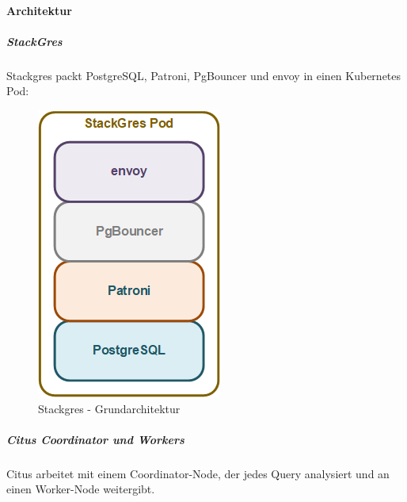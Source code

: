 \begin{flushleft}
    \paragraph{Architektur}
    \begin{flushleft}
        \subparagraph{StackGres}
        Stackgres packt PostgreSQL, Patroni, PgBouncer und envoy in einen Kubernetes Pod:
        \begin{figure}[H]
            \centering
            \includegraphics[width=0.65\linewidth]{source/implementation/evaluation/postgresql_ha_solutions/stackgres/stackgres_pod_architecture}
            \caption{Stackgres - Grundarchitektur}
            \label{fig:stackgres_pod_architecture}
        \end{figure}
    \end{flushleft}
    \begin{flushleft}
        \subparagraph{Citus Coordinator und Workers}
        Citus arbeitet mit einem Coordinator-Node, der jedes Query analysiert und an einen Worker-Node weitergibt.
        \begin{figure}[H]
            \centering

\end{figure}
\end{flushleft}
\end{flushleft}
